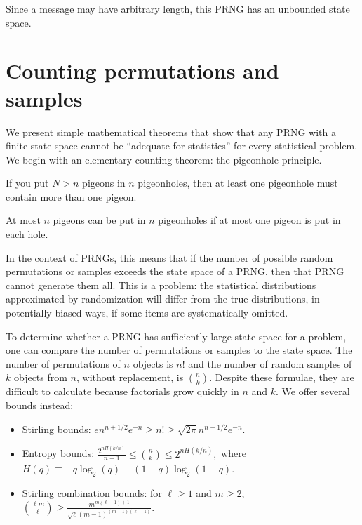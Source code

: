 \documentclass[graybox]{svmult}
\begin{document}
Since a message may have arbitrary length, this PRNG has an unbounded state space.


\section{Counting permutations and samples}
\label{sec:count}

We present simple mathematical theorems that show that any PRNG with a finite state space
cannot be ``adequate for statistics'' for every statistical problem.
We begin with an elementary counting theorem: the pigeonhole principle.


\begin{theorem}
If you put $N>n$ pigeons in $n$ pigeonholes, then at least one
pigeonhole must contain more than one pigeon.
\end{theorem}
\begin{corollary}
At most $n$ pigeons can be put in $n$ pigeonholes if at most
one pigeon is put in each hole.
\end{corollary}

In the context of PRNGs, this means that if the number of possible random permutations or samples exceeds
the state space of a PRNG, then that PRNG cannot generate them all.
This is a problem: the statistical distributions approximated by randomization will differ from the true distributions,
in potentially biased ways, if some items are systematically omitted.

To determine whether a PRNG has sufficiently large state space for a problem, one can compare the number of
permutations or samples to the state space.
The number of permutations of $n$ objects is $n!$ and the number of random samples of $k$ objects from $n$,
 without replacement, is $n \choose k$.
Despite these formulae, they are difficult to calculate because factorials grow quickly in $n$ and $k$.
We offer several bounds instead:
\begin{itemize}
\item Stirling bounds: $ e n^{n+1/2} e^{-n} \ge n! \ge \sqrt{2 \pi} n^{n+1/2} e^{-n}.$
\item Entropy bounds:
$ \frac{2^{nH(k/n)}}{n+1} \le {n \choose k} \le 2^{nH(k/n)},$ where $H(q) \equiv -q \log_2(q) - (1-q) \log_2 (1-q)$.
\item Stirling combination bounds:
for $\ell \ge 1$ and $m \ge 2$, $ { {\ell m } \choose { \ell }} \ge \frac{m^{m(\ell-1)+1}}{\sqrt{\ell} (m-1)^{(m-1)(\ell-1)}}. $
\end{itemize}
\end{document}
